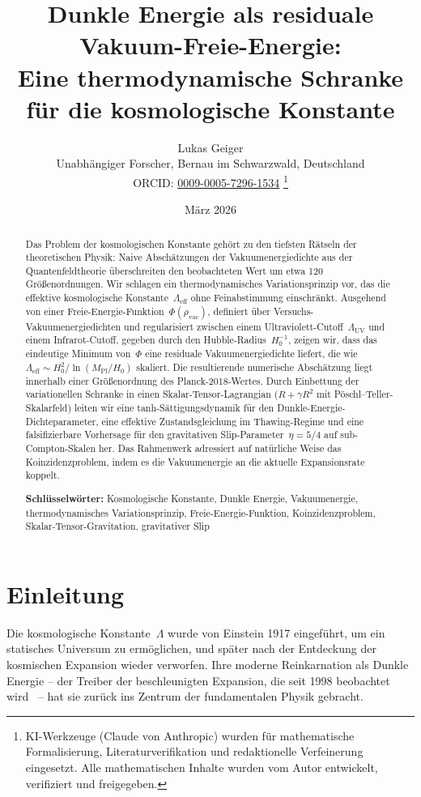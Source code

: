 \documentclass[12pt,a4paper]{article}
\title{\textbf{Dunkle Energie als residuale Vakuum-Freie-Energie:\\[4pt]
Eine thermodynamische Schranke f\"ur die kosmologische Konstante}}
\author{Lukas Geiger\\[2pt]
\small Unabh\"angiger Forscher, Bernau im Schwarzwald, Deutschland\\[2pt]
\small ORCID: \href{https://orcid.org/0009-0005-7296-1534}{0009-0005-7296-1534}%
\thanks{KI-Werkzeuge (Claude von Anthropic) wurden für mathematische Formalisierung, Literaturverifikation und redaktionelle Verfeinerung eingesetzt. Alle mathematischen Inhalte wurden vom Autor entwickelt, verifiziert und freigegeben.}}
\date{M\"arz 2026}
\theoremstyle{definition}
\theoremstyle{plain}
\theoremstyle{remark}
\newcommand{\Leff}{\Lambda_{\mathrm{eff}}}
\newcommand{\LUV}{\Lambda_{\mathrm{UV}}}
\newcommand{\rhov}{\rho_{\mathrm{vac}}}
\begin{document}
\maketitle

\begin{abstract}
Das Problem der kosmologischen Konstante geh\"ort zu den tiefsten
R\"atseln der theoretischen Physik: Naive Absch\"atzungen der
Vakuumenergiedichte aus der Quantenfeldtheorie \"uberschreiten den
beobachteten Wert um etwa 120 Gr\"o\ss enordnungen. Wir schlagen ein
thermodynamisches Variationsprinzip vor, das die effektive kosmologische
Konstante~$\Leff$ ohne Feinabstimmung einschr\"ankt. Ausgehend von einer
Freie-Energie-Funktion~$\Phi(\rhov)$, definiert \"uber
Versuchs-Vakuumenergiedichten und regularisiert zwischen einem
Ultraviolett-Cutoff~$\LUV$ und einem Infrarot-Cutoff, gegeben durch den
Hubble-Radius~$H_0^{-1}$, zeigen wir, dass das eindeutige Minimum
von~$\Phi$ eine residuale Vakuumenergiedichte liefert, die
wie~$\Leff \sim H_0^{2}/\ln(M_{\mathrm{Pl}}/H_0)$ skaliert. Die
resultierende numerische Absch\"atzung liegt innerhalb einer
Gr\"o\ss enordnung des Planck-2018-Wertes.  Durch Einbettung der
variationellen Schranke in einen Skalar-Tensor-Lagrangian
($R + \gamma R^{2}$ mit P\"oschl--Teller-Skalarfeld) leiten wir eine
tanh-S\"attigungsdynamik f\"ur den Dunkle-Energie-Dichteparameter, eine
effektive Zustandsgleichung im Thawing-Regime und eine falsifizierbare
Vorhersage f\"ur den gravitativen Slip-Parameter~$\eta = 5/4$ auf
sub-Compton-Skalen her.  Das Rahmenwerk adressiert auf nat\"urliche
Weise das Koinzidenzproblem, indem es die Vakuumenergie an die aktuelle
Expansionsrate koppelt.

\medskip\noindent
\textbf{Schl\"usselw\"orter:} Kosmologische Konstante, Dunkle Energie,
Vakuumenergie, thermodynamisches Variationsprinzip, Freie-Energie-Funktion,
Koinzidenzproblem, Skalar-Tensor-Gravitation, gravitativer Slip
\end{abstract}

\section{Einleitung}\label{sec:intro}

Die kosmologische Konstante~$\Lambda$ wurde von Einstein 1917 eingef\"uhrt,
um ein statisches Universum zu erm\"oglichen, und sp\"ater nach der
Entdeckung der kosmischen Expansion wieder verworfen. Ihre moderne
Reinkarnation als Dunkle Energie -- der Treiber der beschleunigten
Expansion, die seit 1998 beobachtet
wird~\cite{Riess1998,Perlmutter1999} -- hat sie zur\"uck ins Zentrum
der fundamentalen Physik gebracht.
\end{document}
